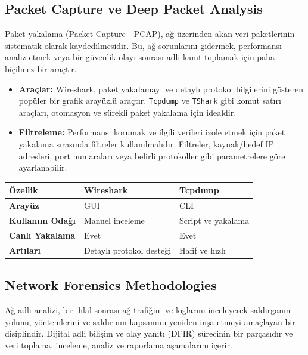 \subsection{Packet Capture ve Deep Packet Analysis}

Paket yakalama (Packet Capture - PCAP), ağ üzerinden akan veri paketlerinin sistematik olarak kaydedilmesidir. Bu, ağ sorunlarını gidermek, performansı analiz etmek veya bir güvenlik olayı sonrası adli kanıt toplamak için paha biçilmez bir araçtır.

\begin{itemize}
\item \textbf{Araçlar:} Wireshark, paket yakalamayı ve detaylı protokol bilgilerini gösteren popüler bir grafik arayüzlü araçtır. \texttt{Tcpdump} ve \texttt{TShark} gibi komut satırı araçları, otomasyon ve sürekli paket yakalama için idealdir.
\item \textbf{Filtreleme:} Performansı korumak ve ilgili verileri izole etmek için paket yakalama sırasında filtreler kullanılmalıdır. Filtreler, kaynak/hedef IP adresleri, port numaraları veya belirli protokoller gibi parametrelere göre ayarlanabilir.
\end{itemize}


\begin{tabular}{|p{4cm}|p{6cm}|p{4cm}|}
\hline
\hline
\textbf{Özellik} & \textbf{Wireshark} & \textbf{Tcpdump}  \\
\hline
\hline
\textbf{Arayüz} & GUI & CLI  \\
\hline
\hline
\textbf{Kullanım Odağı} & Manuel inceleme & Script ve yakalama  \\
\hline
\hline
\textbf{Canlı Yakalama} & Evet & Evet  \\
\hline
\hline
\textbf{Artıları} & Detaylı protokol desteği & Hafif ve hızlı  \\
\hline
\hline
\hline
\end{tabular}



\subsection{Network Forensics Methodologies}

Ağ adli analizi, bir ihlal sonrası ağ trafiğini ve loglarını inceleyerek saldırganın yolunu, yöntemlerini ve saldırının kapsamını yeniden inşa etmeyi amaçlayan bir disiplindir. Dijital adli bilişim ve olay yanıtı (DFIR) sürecinin bir parçasıdır ve veri toplama, inceleme, analiz ve raporlama aşamalarını içerir.

